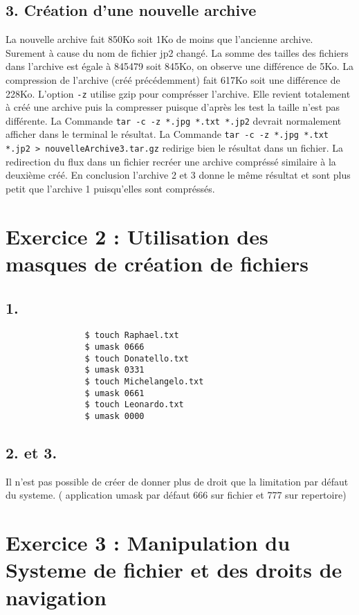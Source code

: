         \subsection{3. Création d'une nouvelle archive}
            La nouvelle archive fait 850Ko soit 1Ko de moins que l'ancienne archive. Surement à cause du nom de fichier jp2 changé.
            La somme des tailles des fichiers dans l'archive est égale à 845479 soit 845Ko, on observe une différence de 5Ko.
            La compression de l'archive (créé précédemment) fait 617Ko soit une différence de 228Ko.
            L'option \texttt{-z} utilise gzip pour comprésser l'archive.
            Elle revient totalement à créé une archive puis la compresser puisque d'après les test la taille n'est pas différente.
            La Commande \texttt{tar -c -z *.jpg *.txt *.jp2} devrait normalement afficher dans le terminal le résultat.
            La Commande \texttt{tar -c -z *.jpg *.txt *.jp2 > nouvelleArchive3.tar.gz} redirige bien le résultat dans un fichier.
            La redirection du flux dans un fichier recréer une archive compréssé similaire à la deuxième créé.
            En conclusion l'archive 2 et 3 donne le même résultat et sont plus petit que l'archive 1 puisqu'elles sont compréssés.
    \section{Exercice 2 : Utilisation des masques de création de fichiers}
        \subsection{1.}
            \begin{lstlisting}
                $ touch Raphael.txt
                $ umask 0666
                $ touch Donatello.txt
                $ umask 0331
                $ touch Michelangelo.txt
                $ umask 0661
                $ touch Leonardo.txt
                $ umask 0000
            \end{lstlisting}
        \subsection{2. et 3.}
            Il n'est pas possible de créer de donner plus de droit que la limitation par défaut du systeme.
            ( application umask par défaut 666 sur fichier et 777 sur repertoire)
    \section{Exercice 3 : Manipulation du Systeme de fichier et des droits de navigation}

